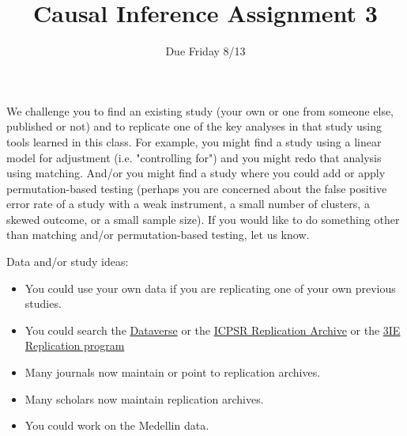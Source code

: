 \documentclass{article}
\title{Causal Inference Assignment 3}
\author{Due Friday 8/13}
\begin{document}
\maketitle

We challenge you to find an existing study (your own or one from someone else, published or not) and to replicate one of the key analyses in that study using tools learned in this class. For example, you might find a study using a linear model for adjustment (i.e. "controlling for") and you might redo that analysis using matching. And/or you might find a study where you could add or apply permutation-based testing (perhaps you are concerned about the false positive error rate of a study with a weak instrument, a small number of clusters, a skewed outcome, or a small sample size). If you would like to do something other than matching and/or permutation-based testing, let us know.

Data and/or study ideas:
\begin{itemize}
 \item You could use your own data if you are replicating one of your own previous studies.
 \item You could search the \href{http://dataverse.org/}{Dataverse} or the \href{http://www.icpsr.umich.edu/icpsrweb/deposit/pra/index.jsp}{ICPSR Replication Archive} or the \href{http://www.3ieimpact.org/evaluation/impact-evaluation-replication-programme/}{3IE Replication program}
 \item Many journals now maintain or point to replication archives.
 \item Many scholars now maintain replication archives.
 \item You could work on the Medellin data.
\end{itemize}
\end{document}
